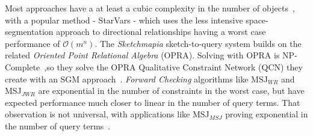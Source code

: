     \par{Most approaches have a at least a cubic complexity in the number of objects~\cite{Dylla2017}, with a popular method - StarVars - which uses the less intensive space-segmentation approach to directional relationships having a worst case performance of  $\mathcal{O}(m^n)$. The \textit{Sketchmapia} sketch-to-query system builds on the related \textit{Oriented Point Relational Algebra} (OPRA). Solving with OPRA is NP-Complete~\cite{Dylla2017},so they solve the OPRA Qualitative Constraint Network (QCN) they create with an SGM approach~\cite{Schwering2014,Jan2015}.
    \textit{Forward Checking} algorithms like MSJ$_{WR}$ and MSJ$_{JWR}$ are exponential in the number of constraints in the worst case, but have expected performance much closer to linear in the number of query terms.
    That observation is not universal, with applications like MSJ$_{MSJ}$ proving exponential in the number of query terms~\cite{Papadias1998}.} 



